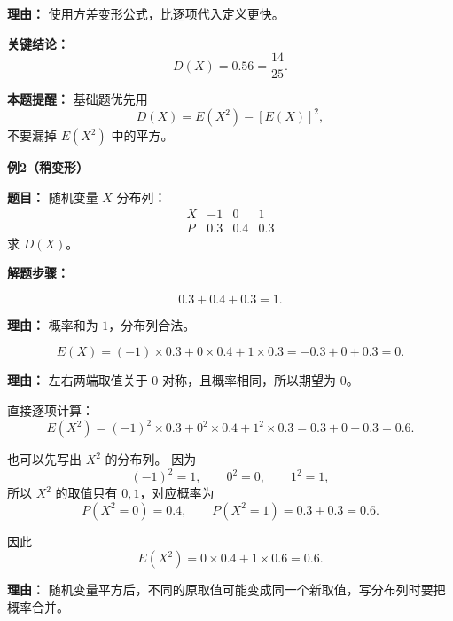 \begin{examplebox}
\begin{description}[style=nextline, leftmargin=2.8em, labelsep=0.5em, itemsep=0.45em]
		      \par\textbf{理由：}
		      使用方差变形公式，比逐项代入定义更快。
	\end{description}

	\textbf{\textcolor{CExample}{关键结论：}}
	\[
		\boxed{D(X)=0.56=\frac{14}{25}}.
	\]

	\textbf{\textcolor{CExample}{本题提醒：}}
	基础题优先用
	\[
		D(X)=E(X^2)-[E(X)]^2,
	\]
	不要漏掉 $E(X^2)$ 中的平方。

	\medskip

	\textbf{\textcolor{CExample}{例2（稍变形）}}

	\textbf{\textcolor{CExample}{题目：}}
	随机变量 $X$ 分布列：
	\[
		\begin{array}{c|ccc}
			X & -1  & 0   & 1   \\
			\hline
			P & 0.3 & 0.4 & 0.3
		\end{array}
	\]
	求 $D(X)$。

	\textbf{\textcolor{CExample}{解题步骤：}}

	\begin{description}[style=nextline, leftmargin=2.8em, labelsep=0.5em, itemsep=0.45em]
		\item[\textbf{第一步（检查概率）：}]
		      \[
			      0.3+0.4+0.3=1.
		      \]

		      \par\textbf{理由：}
		      概率和为 $1$，分布列合法。

		\item[\textbf{第二步（求期望）：}]
		      \[
			      E(X)=(-1)\times0.3+0\times0.4+1\times0.3
			      =-0.3+0+0.3=0.
		      \]

		      \par\textbf{理由：}
		      左右两端取值关于 $0$ 对称，且概率相同，所以期望为 $0$。

		\item[\textbf{第三步（求 $E(X^2)$）：}]
		      直接逐项计算：
		      \[
			      E(X^2)=(-1)^2\times0.3+0^2\times0.4+1^2\times0.3
			      =0.3+0+0.3=0.6.
		      \]

		      也可以先写出 $X^2$ 的分布列。
		      因为
		      \[
			      (-1)^2=1,\qquad 0^2=0,\qquad 1^2=1,
		      \]
		      所以 $X^2$ 的取值只有 $0,1$，对应概率为
		      \[
			      P(X^2=0)=0.4,\qquad P(X^2=1)=0.3+0.3=0.6.
		      \]

		      因此
		      \[
			      E(X^2)=0\times0.4+1\times0.6=0.6.
		      \]

		      \par\textbf{理由：}
		      随机变量平方后，不同的原取值可能变成同一个新取值，写分布列时要把概率合并。


\end{description}
\end{examplebox}
